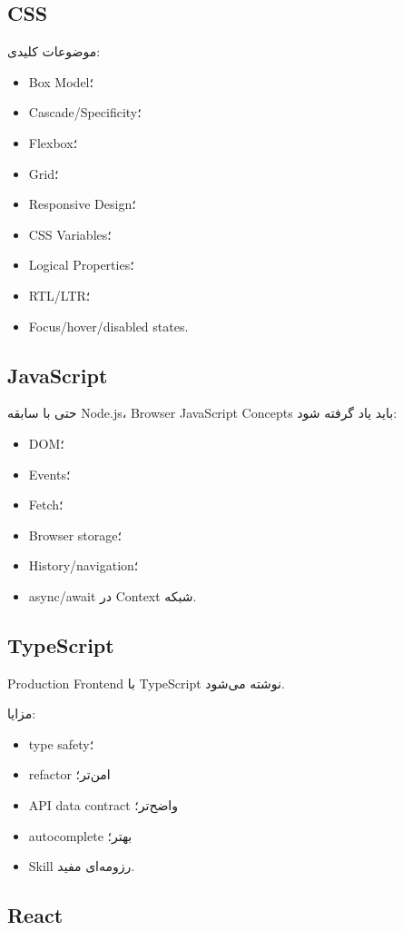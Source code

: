 \subsection{CSS}

موضوعات کلیدی:
\begin{itemize}
  \item Box Model؛
  \item Cascade/Specificity؛
  \item Flexbox؛
  \item Grid؛
  \item Responsive Design؛
  \item CSS Variables؛
  \item Logical Properties؛
  \item RTL/LTR؛
  \item Focus/hover/disabled states.
\end{itemize}

\subsection{JavaScript}

حتی با سابقه Node.js، Browser JavaScript Concepts باید یاد گرفته شود:
\begin{itemize}
  \item DOM؛
  \item Events؛
  \item Fetch؛
  \item Browser storage؛
  \item History/navigation؛
  \item async/await در Context شبکه.
\end{itemize}

\subsection{TypeScript}

Production Frontend با TypeScript نوشته می‌شود.

مزایا:
\begin{itemize}
  \item type safety؛
  \item refactor امن‌تر؛
  \item API data contract واضح‌تر؛
  \item autocomplete بهتر؛
  \item Skill رزومه‌ای مفید.
\end{itemize}

\subsection{React}

